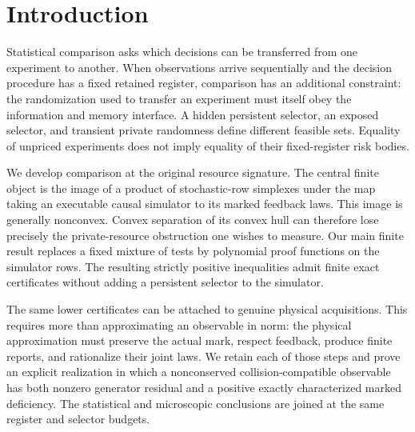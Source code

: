 \section{Introduction}\label{sec:v16-introduction}
Statistical comparison asks which decisions can be transferred from
one experiment to another. When observations arrive sequentially and
the decision procedure has a fixed retained register, comparison has
an additional constraint: the randomization used to transfer an
experiment must itself obey the information and memory interface.
A hidden persistent selector, an exposed selector, and transient private
randomness define different feasible sets. Equality of unpriced
experiments does not imply equality of their fixed-register risk bodies.

We develop comparison at the original resource signature. The central
finite object is the image of a product of stochastic-row simplexes
under the map taking an executable causal simulator to its marked
feedback laws. This image is generally nonconvex. Convex separation
of its convex hull can therefore lose precisely the private-resource
obstruction one wishes to measure. Our main finite result replaces a
fixed mixture of tests by polynomial proof functions on the simulator
rows. The resulting strictly positive inequalities admit finite exact
certificates without adding a persistent selector to the simulator.

The same lower certificates can be attached to genuine physical
acquisitions. This requires more than approximating an observable in
norm: the physical approximation must preserve the actual mark,
respect feedback, produce finite reports, and rationalize their joint
laws. We retain each of those steps and prove an explicit realization
in which a nonconserved collision-compatible observable has both
nonzero generator residual and a positive exactly characterized marked
deficiency. The statistical and microscopic conclusions are joined at
the same register and selector budgets.


